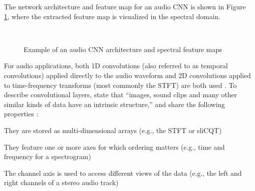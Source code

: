 \documentclass[report.tex]{subfiles}
\begin{document}
The network architecture and feature map for an audio CNN is shown in Figure \ref{fig:audiocnn}, where the extracted feature map is visualized in the spectral domain.

\begin{figure}[ht]
	\centering
	\\
	\caption{Example of an audio CNN architecture and spectral feature maps}
	\label{fig:audiocnn}
\end{figure}

For audio applications, both 1D convolutions (also referred to as temporal convolutions) applied directly to the audio waveform and 2D convolutions applied to time-frequency transforms (most commonly the STFT) are both used \parencite{tcn, 2dconv}. To describe convolutional layers, \citeauthor{convguide} state that ``images, sound clips and many other similar kinds of data have an intrinsic structure,'' and share the following properties \parencite[6]{convguide}:

\begin{tight_enumerate}
	\item
		They are stored as multi-dimensional arrays (e.g., the STFT or sliCQT)
	\item
		They feature one or more axes for which ordering matters (e.g., time and frequency for a spectrogram)
	\item
		The channel axis is used to access different views of the data (e.g., the left and right channels of a stereo audio track)
\end{tight_enumerate}
\end{document}
